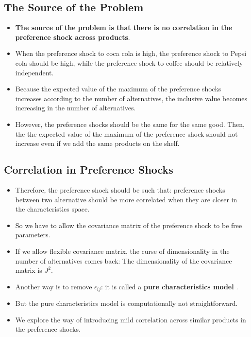 \documentclass[]{book}
\providecommand{\tightlist}{%
  \setlength{\itemsep}{0pt}\setlength{\parskip}{0pt}}
\begin{document}
\subsection{The Source of the Problem}\label{the-source-of-the-problem}

\begin{itemize}
\tightlist
\item
  \textbf{The source of the problem is that there is no correlation in
  the preference shock across products}.
\item
  When the preference shock to coca cola is high, the preference shock
  to Pepsi cola should be high, while the preference shock to coffee
  should be relatively independent.
\item
  Because the expected value of the maximum of the preference shocks
  increases according to the number of alternatives, the inclusive value
  becomes increasing in the number of alternatives.
\item
  However, the preference shocks should be the same for the same good.
  Then, the the expected value of the maximum of the preference shock
  should not increase even if we add the same products on the shelf.
\end{itemize}

\subsection{Correlation in Preference
Shocks}\label{correlation-in-preference-shocks}

\begin{itemize}
\tightlist
\item
  Therefore, the preference shock should be such that: preference shocks
  between two alternative should be more correlated when they are closer
  in the characteristics space.
\item
  So we have to allow the covariance matrix of the preference shock to
  be free parameters.
\item
  If we allow flexible covariance matrix, the curse of dimensionality in
  the number of alternatives comes back: The dimensionality of the
  covariance matrix is \(J^2\).
\item
  Another way is to remove \(\epsilon_{ij}\): it is called a
  \textbf{pure characteristics model} \citep{Berry2007}.
\item
  But the pure characteristics model is computationally not
  straightforward.
\item
  We explore the way of introducing mild correlation across similar
  products in the preference shocks.
\end{itemize}
\end{document}
